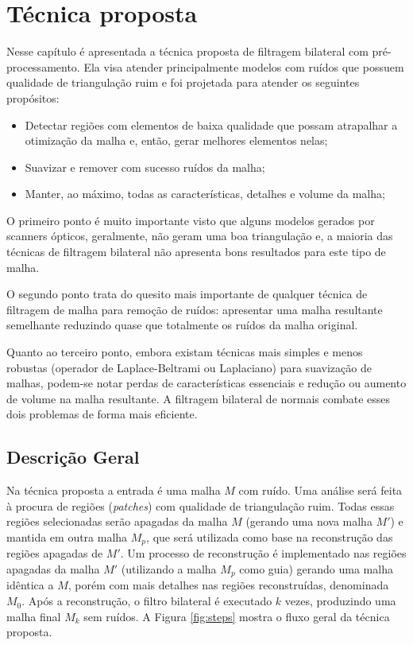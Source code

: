 \chapter{Técnica proposta}
\label{chap:tecnicaproposta}

Nesse capítulo é apresentada a técnica proposta de filtragem bilateral com pré-processamento. Ela visa atender principalmente modelos com ruídos que possuem qualidade de triangulação ruim e foi projetada para atender os seguintes propósitos:

\begin{itemize}  
\item Detectar regiões com elementos de baixa qualidade que possam atrapalhar a otimização da malha e, então, gerar melhores elementos nelas;
\item Suavizar e remover com sucesso ruídos da malha;
\item Manter, ao máximo, todas as características, detalhes e volume da malha;
\end{itemize}

O primeiro ponto é muito importante visto que alguns modelos gerados por scanners ópticos, geralmente, não geram uma boa triangulação e, a maioria das técnicas de filtragem bilateral não apresenta bons resultados para este tipo de malha.

O segundo ponto trata do quesito mais importante de qualquer técnica de filtragem de malha para remoção de ruídos: apresentar uma malha resultante semelhante reduzindo quase que totalmente os ruídos da malha original.

Quanto ao terceiro ponto, embora existam técnicas mais simples e menos robustas (operador de Laplace-Beltrami ou Laplaciano) para suavização de malhas, podem-se notar perdas de características essenciais e redução ou aumento de volume na malha resultante. A filtragem bilateral de normais combate esses dois problemas de forma mais eficiente.

\section{Descrição Geral}

Na técnica proposta a entrada é uma malha $M$ com ruído. Uma análise será feita à procura de regiões (\textit{patches}) com qualidade de triangulação ruim. Todas essas regiões selecionadas serão apagadas da malha $M$ (gerando uma nova malha $M'$) e mantida em outra malha $M_p$, que será utilizada como base na reconstrução das regiões apagadas de $M'$. Um processo de reconstrução é implementado nas regiões apagadas da malha $M'$ (utilizando a malha $M_p$ como guia) gerando uma malha idêntica a $M$, porém com mais detalhes nas regiões reconstruídas, denominada $M_0$. Após a reconstrução, o filtro bilateral é executado $k$ vezes, produzindo uma malha final $M_k$ sem ruídos. A Figura \ref{fig:steps} mostra o fluxo geral da técnica proposta.

